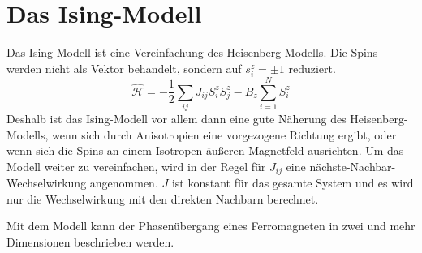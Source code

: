 \section{Das Ising-Modell}
Das Ising-Modell ist eine Vereinfachung des Heisenberg-Modells. Die Spins werden nicht als Vektor behandelt, sondern auf $s_i^z = \pm 1$ reduziert.
\begin{equation}
  \hat{\mathcal H} = -\frac 12\sum _{ij} J_{ij} S_i^z S_j^z - B_z \sum_{i=1}^N S_i^z
\end{equation}
Deshalb ist das Ising-Modell vor allem dann eine gute Näherung des Heisenberg-Modells, wenn sich durch Anisotropien eine vorgezogene Richtung ergibt, oder wenn sich die Spins an einem Isotropen äußeren Magnetfeld ausrichten.
Um das Modell weiter zu vereinfachen, wird in der Regel für $J_{ij}$ eine nächste-Nachbar-Wechselwirkung angenommen. $J$ ist konstant für das gesamte System und es wird nur die Wechselwirkung mit den direkten Nachbarn berechnet.

Mit dem Modell kann der Phasenübergang eines Ferromagneten in zwei und mehr Dimensionen beschrieben werden.